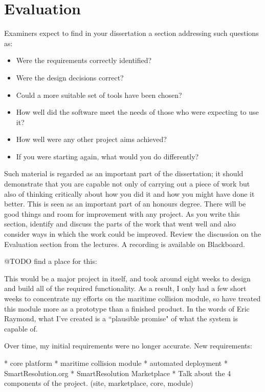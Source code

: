 \chapter{Evaluation}

Examiners expect to find in your dissertation a section addressing such questions as:

\begin{itemize}
   \item Were the requirements correctly identified? 
   \item Were the design decisions correct?
   \item Could a more suitable set of tools have been chosen?
   \item How well did the software meet the needs of those who were expecting to use it?
   \item How well were any other project aims achieved?
   \item If you were starting again, what would you do differently?
\end{itemize}

Such material is regarded as an important part of the dissertation; it should demonstrate that you are capable not only of carrying out a piece of work but also of thinking critically about how you did it and how you might have done it better. This is seen as an important part of an honours degree. There will be good things and room for improvement with any project. As you write this section, identify and discuss the parts of the work that went well and also consider ways in which the work could be improved. Review the discussion on the Evaluation section from the lectures. A recording is available on Blackboard. 

@TODO find a place for this:

This would be a major project in itself, and took around eight weeks to design and build all of the required functionality. As a result, I only had a few short weeks to concentrate my efforts on the maritime collision module, so have treated this module more as a prototype than a finished product. In the words of Eric Raymond, what I've created is a ``plausible promise" of what the system is capable of.


Over time, my initial requirements were no longer accurate. New requirements:

* core platform
* maritime collision module
* automated deployment
* SmartResolution.org
* SmartResolution Marketplace
* Talk about the 4 components of the project. (site, marketplace, core, module)

